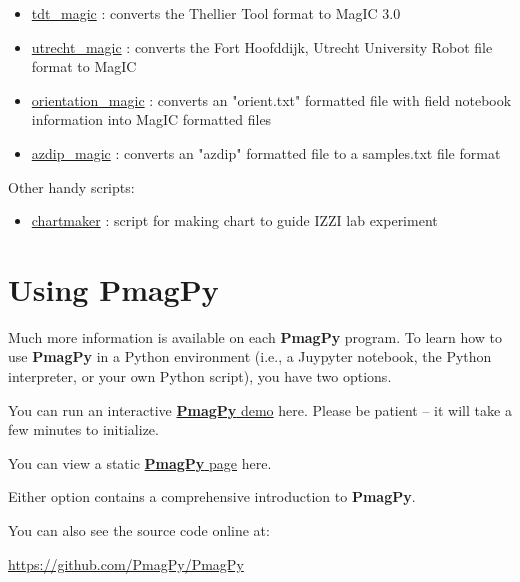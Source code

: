 \documentclass[11pt]{book}
\begin{document}
{{\begin{itemize}
\begin{itemize}
\item \href{http://pmagpy.github.io/PmagPy.html#tdt_magic}{tdt\_magic} : converts the Thellier Tool format to MagIC 3.0
\item \href{http://pmagpy.github.io/PmagPy.html#utrecht_magic}{utrecht\_magic} : converts the Fort Hoofddijk, Utrecht University Robot file format to MagIC
\item \href{http://pmagpy.github.io/PmagPy.html#orientation_magic}{orientation\_magic} : converts an "orient.txt" formatted file with field notebook information into MagIC formatted files
\item \href{http://pmagpy.github.io/PmagPy.html#azdip_magic}{azdip\_magic} : converts an "azdip" formatted file to a samples.txt file format
  \end{itemize}

\end{itemize}

Other handy scripts:

\begin{itemize}

\item \href{http://pmagpy.github.io/PmagPy.html#chartmaker}{chartmaker} : script for making chart to guide IZZI lab experiment

  \end{itemize}


\section{Using PmagPy}

Much more information is available on each {\bf PmagPy} program.  To learn how to use {\bf PmagPy} in a Python environment (i.e., a Juypyter notebook, the Python interpreter, or your own Python script), you have two options.

You can run an interactive \href{https://mybinder.org/v2/gh/PmagPy/PmagPy-notebooks/master?filepath=PmagPy.ipynb}{{\bf PmagPy} demo} here.  Please be patient -- it will take a few minutes to initialize.

You can view a static \href{http://pmagpy.github.io/PmagPy.html}{{\bf PmagPy} page} here.

Either option contains a comprehensive introduction to {\bf PmagPy}.

You can also see the source code online at:


 \url{https://github.com/PmagPy/PmagPy}



}}
\end{document}
